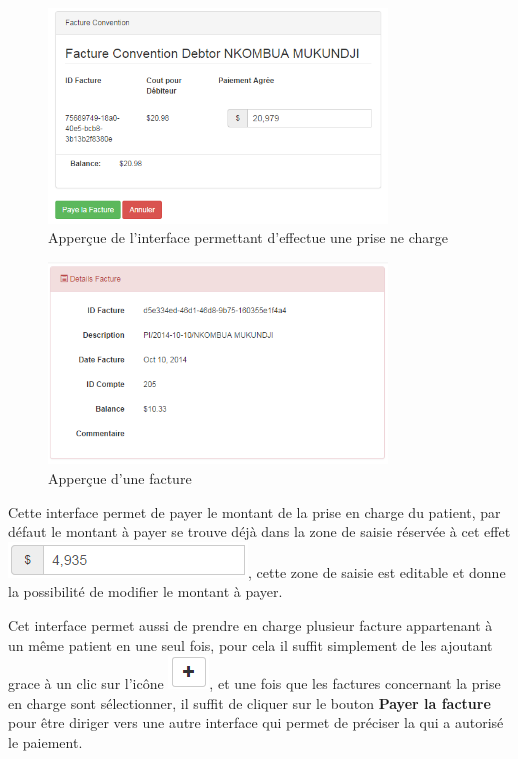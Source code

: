 \documentclass[12pt,a4paper]{report}
\begin{document}
\begin{figure}[h]
\begin{center}
\includegraphics[width=9cm]{pic/FactConv1.png}
\end{center}
\caption{Apperçue de l'interface permettant d'effectue une prise ne charge}
\label{Apperçue de l'interface permettant d'effectue une prise ne charge}
\end{figure}

\newpage
\begin{figure}[h]
\begin{center}
\includegraphics[width=9cm]{pic/DetailConv.png}
\end{center}
\caption{Apperçue d'une facture}
\label{Apperçue d'une facture}
\end{figure}


Cette interface permet de payer le montant de la prise en charge du patient, par défaut le montant à payer se trouve déjà dans la zone de saisie réservée à cet effet \includegraphics[scale=0.7]{pic/editableDeb.png}, cette zone de saisie est editable et donne la possibilité de modifier le montant à payer. 

Cet interface permet aussi de prendre en charge plusieur facture appartenant à un même patient en une seul fois, pour cela il suffit simplement de les ajoutant grace à un clic sur l'icône \includegraphics[scale=0.7]{pic/plusBlack.png}, et une fois que les factures concernant la prise en charge sont sélectionner, il suffit de cliquer sur le bouton \textbf{Payer la facture} pour être diriger vers une autre interface qui permet de préciser la qui a autorisé le paiement.
\end{document}
